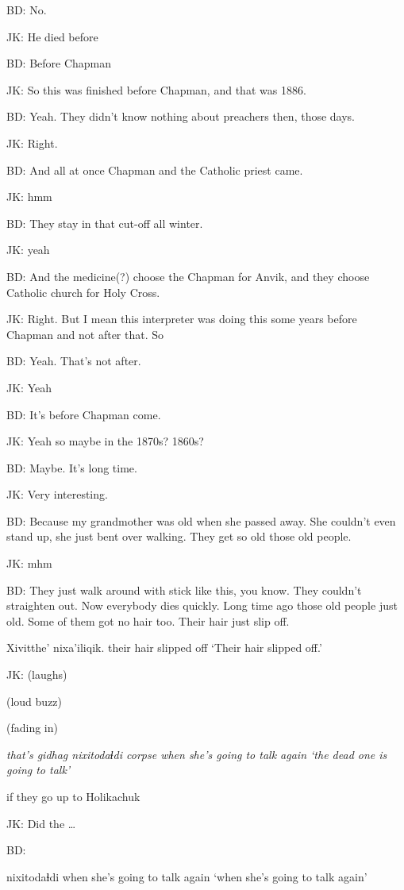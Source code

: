\documentclass[12pt]{article}
\begin{document}
BD:  No.

JK:  He died before 

BD:  Before Chapman

JK: So this was finished before Chapman, and that was 1886.

BD:  Yeah. They didn't know nothing about preachers then, those days.

JK:  Right.

BD: And all at once Chapman and the Catholic priest came. 

JK:  hmm

BD:  They stay in
that cut-off all winter.  

JK:  yeah

BD:  And the medicine(?) choose the Chapman for
Anvik, and they choose Catholic church for Holy Cross.

JK: Right. But I mean this interpreter was doing this some years
before Chapman and not after that. So

BD:  Yeah. That's not after.

JK:  Yeah

BD:  It's before Chapman come.

JK:  Yeah so maybe in the 1870s? 1860s?

BD:  Maybe. It's long time.

JK:  Very interesting.

BD: Because my grandmother was old when she passed away.  She couldn't even
stand up, she just bent over walking.  They get so old those old
people. 

JK:  mhm

BD:  They just walk around with stick like this, you know.  They
couldn't straighten out.  Now everybody dies quickly. Long time ago
those old people just old. Some of them got no hair too. Their hair
just slip off.  

\gll Xivitthe' nixa'iliqik.
{their hair} {slipped off}
\glt `Their hair slipped off.'
\glend

JK:  (laughs)

(loud buzz)

(fading in)

\gll \em that's gidhag nixitodaɬdi                
{}          corpse {when she's going to talk again}
\glt `the dead one is going to talk'
\glend

if they go up to Holikachuk

JK:  Did the \ldots

BD:  

\gll nixitodaɬdi 
{{when she's going to talk again}}
\glt `when she's going to talk again'
\glend
\end{document}
